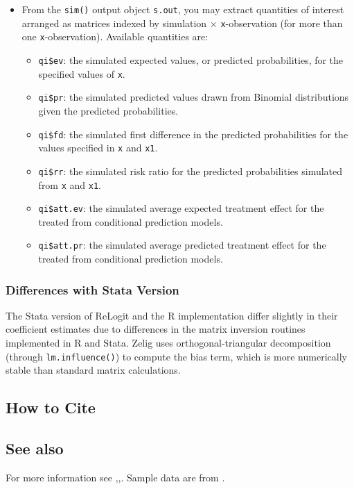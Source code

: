 \begin{itemize}
\item From the {\tt sim()} output object {\tt s.out}, you may extract
  quantities of interest arranged as matrices indexed by simulation
  $\times$ {\tt x}-observation (for more than one {\tt x}-observation).
  Available quantities are:

   \begin{itemize}
   \item {\tt qi\$ev}: the simulated expected values, or predicted
     probabilities, for the specified values of {\tt x}.
   \item {\tt qi\$pr}: the simulated predicted values drawn from Binomial
     distributions given the predicted probabilities.  
   \item {\tt qi\$fd}: the simulated first difference in the predicted
     probabilities for the values specified in {\tt x} and {\tt x1}.
   \item {\tt qi\$rr}: the simulated risk ratio for the predicted
     probabilities simulated from {\tt x} and {\tt x1}.
   \item {\tt qi\$att.ev}: the simulated average expected treatment
     effect for the treated from conditional prediction models.  
   \item {\tt qi\$att.pr}: the simulated average predicted treatment
     effect for the treated from conditional prediction models.  
   \end{itemize}
\end{itemize}

\subsubsection{Differences with Stata Version}
The Stata version of ReLogit and the R implementation differ slightly
in their coefficient estimates due to differences in the matrix
inversion routines implemented in R and Stata.  Zelig uses
orthogonal-triangular decomposition (through {\tt lm.influence()}) to
compute the bias term, which is more numerically stable than
standard matrix calculations.


\subsection* {How to Cite} 




\subsection* {See also}
For more information see \cite{KinZen01b},\cite{KinZen01},\cite{KinZen02b}.
Sample data are from \cite{KinZen01b}.
